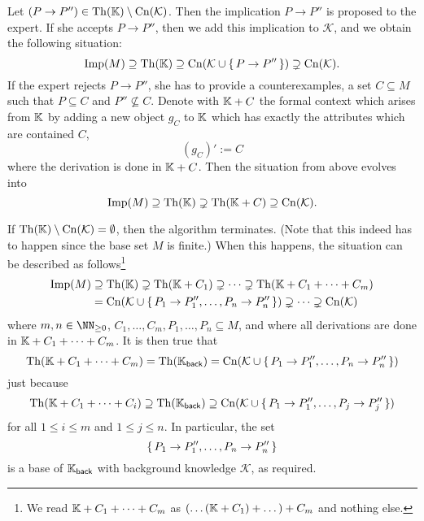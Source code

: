 Let $(P \to P'') \in \operatorname{Th}({\mathbb{K}}) \setminus \operatorname{Cn}(\mathcal{K})$.  Then the implication $P \to
P''$ is proposed to the expert.  If she accepts $P \to P''$, then we add this implication
to $\mathcal{K}$, and we obtain the following situation:
\begin{equation*}
  \operatorname{Imp}(M) \supseteq \operatorname{Th}({\mathbb{K}}) \supseteq \operatorname{Cn}(\mathcal{K} \cup {\ensuremath{\{\, P \to P'' \,\}}})
  \supsetneq \operatorname{Cn}(\mathcal{K}).
\end{equation*}
If the expert rejects $P \to P''$, she has to provide a counterexamples, \ie a set $C
\subseteq M$ such that $P \subseteq C$ and $P'' \not\subseteq C$.  Denote with ${\mathbb{K}} +
C$ the formal context which arises from ${\mathbb{K}}$ by adding a new object $g_C$ to ${\mathbb{K}}$
which has exactly the attributes which are contained $C$, \ie
\begin{equation*}
  (g_C)' := C
\end{equation*}
where the derivation is done in ${\mathbb{K}} + C$.  Then the situation from above evolves into
\begin{equation*}
  \operatorname{Imp}(M) \supseteq \operatorname{Th}({\mathbb{K}}) \supsetneq \operatorname{Th}({\mathbb{K}} + C) \supseteq \operatorname{Cn}(\mathcal{K}).
\end{equation*}

If $\operatorname{Th}({\mathbb{K}}) \setminus \operatorname{Cn}(\mathcal{K}) = \emptyset$, then the algorithm terminates.
(Note that this indeed has to happen since the base set $M$ is finite.)  When this
happens, the situation can be described as follows\footnote{We read ${\mathbb{K}} + C_1 + \dots
  + C_m$ as $(\dots({\mathbb{K}} + C_1) + \dots ) + C_m$ and nothing else.}
\begin{align*}
  \operatorname{Imp}(M) &\supseteq \operatorname{Th}({\mathbb{K}}) \supsetneq \operatorname{Th}({\mathbb{K}} + C_1) \supsetneq \dots \supsetneq
  \operatorname{Th}({\mathbb{K}} + C_1 + \dots + C_m) \\ &= \operatorname{Cn}(\mathcal{K} \cup {\ensuremath{\{\, P_1 \to P_1'', \dots, P_n
    \to P_n'' \,\}}}) \supsetneq \dots \supsetneq \operatorname{Cn}(\mathcal{K})
\end{align*}
where $m, n \in \NN_{\geq 0}$, $C_1, \dots, C_m, P_1, \dots, P_n \subseteq M$, and where
all derivations are done in ${\mathbb{K}} + C_1 + \dots + C_m$.  It is then true that
\begin{equation*}
  \operatorname{Th}({\mathbb{K}} + C_1 + \dots + C_m) = \operatorname{Th}({\mathbb{K}}_{\mathsf{back}}) = \operatorname{Cn}(\mathcal{K} \cup
  {\ensuremath{\{\, P_1 \to P_1'', \dots, P_n \to P_n'' \,\}}})
\end{equation*}
just because
\begin{equation*}
  \operatorname{Th}({\mathbb{K}} + C_1 + \dots + C_i) \supseteq \operatorname{Th}({\mathbb{K}}_{\mathsf{back}}) \supseteq
  \operatorname{Cn}(\mathcal{K} \cup {\ensuremath{\{\, P_1 \to P_1'', \dots, P_j \to P_j''\,\}}} )
\end{equation*}
for all $1 \leq i \leq m$ and $1 \leq j \leq n$.  In particular, the set
\begin{equation*}
  {\ensuremath{\{\,P_1 \to P_1'', \dots, P_n \to P_n''\,\}}}
\end{equation*}
is a base of ${\mathbb{K}}_{\mathsf{back}}$ with background knowledge $\mathcal{K}$, as
required.

